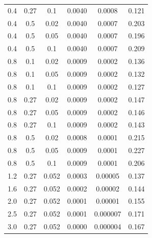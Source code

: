 \begin{table}[ht]
\begin{tabular}{cccccc}
0.4 & 0.27 & 0.1 & 0.0040 & 0.0008 & 0.121 \\
0.4 & 0.5 & 0.02 & 0.0040 & 0.0007 & 0.203 \\
0.4 & 0.5 & 0.05 & 0.0040 & 0.0007 & 0.196 \\
0.4 & 0.5 & 0.1 & 0.0040 & 0.0007 & 0.209 \\
\midrule
0.8 & 0.1 & 0.02 & 0.0009 & 0.0002 & 0.136 \\
0.8 & 0.1 & 0.05 & 0.0009 & 0.0002 & 0.132 \\
0.8 & 0.1 & 0.1 & 0.0009 & 0.0002 & 0.127 \\
0.8 & 0.27 & 0.02 & 0.0009 & 0.0002 & 0.147 \\
0.8 & 0.27 & 0.05 & 0.0009 & 0.0002 & 0.146 \\
0.8 & 0.27 & 0.1 & 0.0009 & 0.0002 & 0.143 \\
0.8 & 0.5 & 0.02 & 0.0008 & 0.0001 & 0.215 \\
0.8 & 0.5 & 0.05 & 0.0009 & 0.0001 & 0.227 \\
0.8 & 0.5 & 0.1 & 0.0009 & 0.0001 & 0.206 \\
\midrule
1.2 & 0.27 & 0.052 & 0.0003 & 0.00005 & 0.137 \\
1.6 & 0.27 & 0.052 & 0.0002 & 0.00002 & 0.144 \\
2.0 & 0.27 & 0.052 & 0.0001 & 0.00001 & 0.155 \\
2.5 & 0.27 & 0.052 & 0.0001 & 0.000007 & 0.171 \\
3.0 & 0.27 & 0.052 & 0.0000 & 0.000004 & 0.167 \\
\bottomrule
\end{tabular}
\end{table}


